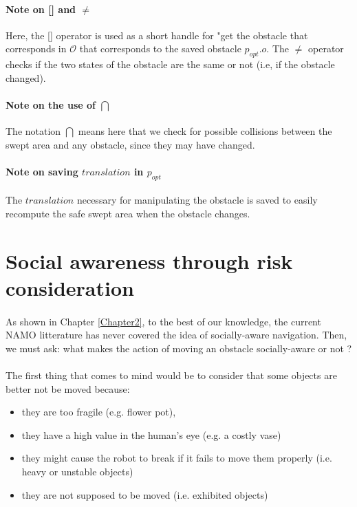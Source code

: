 \paragraph{Note on [] and $\neq$}\label{operators_note} Here, the [] operator is used as a short handle for "get the obstacle that corresponds in $\mathcal{O}$ that corresponds to the saved obstacle $p_{opt}.o$. The $\neq$ operator checks if the two states of the obstacle are the same or not (i.e, if the obstacle changed).

\paragraph{Note on the use of $\bigcap$}\label{area_intersect_note} The notation $\bigcap$ means here that we check for possible collisions between the swept area and any obstacle, since they may have changed.

\paragraph{Note on saving $translation$ in $p_{opt}$}\label{translation_note} The $translation$ necessary for manipulating the obstacle is saved to easily recompute the safe swept area when the obstacle changes.





\section{Social awareness through risk consideration}

\paragraph{} As shown in Chapter \ref{Chapter2}, to the best of our knowledge, the current NAMO litterature has never covered the idea of socially-aware navigation. Then, we must ask: what makes the action of moving an obstacle socially-aware or not ?

\paragraph{} The first thing that comes to mind would be to consider that some objects are better not be moved because:

\begin{itemize}
  \item they are too fragile (e.g. flower pot),
  \item they have a high value in the human’s eye (e.g. a costly vase)
  \item they might cause the robot to break if it fails to move them properly (i.e. heavy or unstable objects)
  \item they are not supposed to be moved (i.e. exhibited objects)
\end{itemize}

